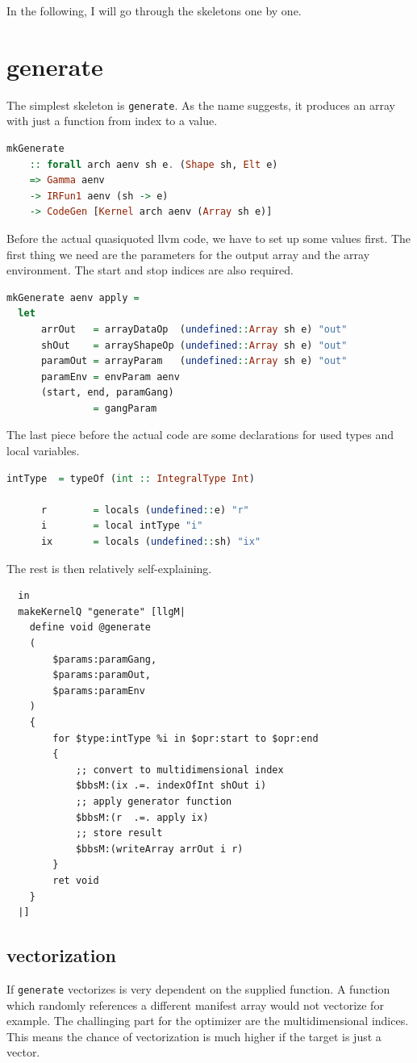 \documentclass[a4paper,bibliography=totocnumbered,parskip,headsepline]{scrbook}
\begin{document}
In the following, I will go through the skeletons one by one.
\section{generate}
The simplest skeleton is \lstinline[language=haskell]!generate!.
As the name suggests, it produces an array with just a function from index to a value.
\begin{lstlisting}[language=haskell]
mkGenerate
    :: forall arch aenv sh e. (Shape sh, Elt e)
    => Gamma aenv
    -> IRFun1 aenv (sh -> e)
    -> CodeGen [Kernel arch aenv (Array sh e)]
\end{lstlisting}
Before the actual quasiquoted llvm code, we have to set up some values first.
The first thing we need are the parameters for the output array and the array environment.
The start and stop indices are also required.
\begin{lstlisting}[language=haskell]
mkGenerate aenv apply =
  let
      arrOut   = arrayDataOp  (undefined::Array sh e) "out"
      shOut    = arrayShapeOp (undefined::Array sh e) "out"
      paramOut = arrayParam   (undefined::Array sh e) "out"
      paramEnv = envParam aenv
      (start, end, paramGang)
               = gangParam
\end{lstlisting}
The last piece before the actual code are some declarations for used types and local variables.
\begin{lstlisting}[language=haskell]
      intType  = typeOf (int :: IntegralType Int)

      r        = locals (undefined::e) "r"
      i        = local intType "i"
      ix       = locals (undefined::sh) "ix"
\end{lstlisting}
The rest is then relatively self-explaining.
\begin{lstlisting}
  in
  makeKernelQ "generate" [llgM|
    define void @generate
    (
        $params:paramGang,
        $params:paramOut,
        $params:paramEnv
    )
    {
        for $type:intType %i in $opr:start to $opr:end
        {
            ;; convert to multidimensional index
            $bbsM:(ix .=. indexOfInt shOut i)
            ;; apply generator function
            $bbsM:(r  .=. apply ix)
            ;; store result
            $bbsM:(writeArray arrOut i r)
        }
        ret void
    }
  |]
\end{lstlisting}
\subsection{vectorization}
If \lstinline[language=haskell]!generate! vectorizes is very dependent on the supplied function.
A function which randomly references a different manifest array would not vectorize for example.
The challinging part for the optimizer are the multidimensional indices.
This means the chance of vectorization is much higher if the target is just a vector.
\end{document}
